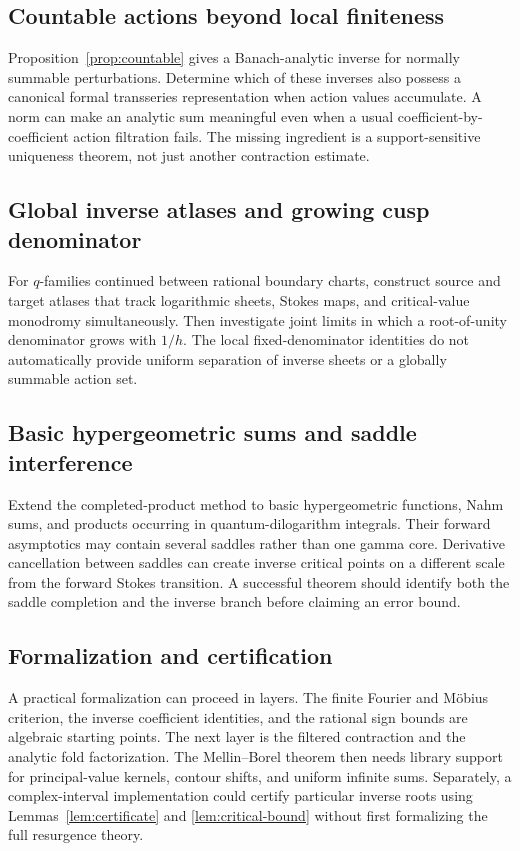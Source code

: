 \documentclass[11pt,a4paper]{article}
\numberwithin{equation}{section}
\theoremstyle{definition}
\theoremstyle{remark}\newtheorem{remark}[theorem]{Remark}
\begin{document}
\subsection{Countable actions beyond local finiteness}
Proposition~\ref{prop:countable} gives a Banach-analytic inverse for
normally summable perturbations. Determine which of these inverses also
possess a canonical formal transseries representation when action
values accumulate. A norm can make an analytic sum meaningful even
when a usual coefficient-by-coefficient action filtration fails.
The missing ingredient is a support-sensitive uniqueness theorem,
not just another contraction estimate.

\subsection{Global inverse atlases and growing cusp denominator}
For $q$-families continued between rational boundary charts, construct
source and target atlases that track logarithmic sheets, Stokes maps,
and critical-value monodromy simultaneously. Then investigate joint
limits in which a root-of-unity denominator grows with $1/h$.
The local fixed-denominator identities do not automatically provide
uniform separation of inverse sheets or a globally summable action set.

\subsection{Basic hypergeometric sums and saddle interference}
Extend the completed-product method to basic hypergeometric functions,
Nahm sums, and products occurring in quantum-dilogarithm integrals.
Their forward asymptotics may contain several saddles rather than one
gamma core. Derivative cancellation between saddles can create inverse
critical points on a different scale from the forward Stokes transition.
A successful theorem should identify both the saddle completion and the
inverse branch before claiming an error bound.

\subsection{Formalization and certification}
A practical formalization can proceed in layers. The finite Fourier and
M\"obius criterion, the inverse coefficient identities, and the
rational sign bounds are algebraic starting points. The next layer is
the filtered contraction and the analytic fold factorization. The
Mellin--Borel theorem then needs library support for principal-value
kernels, contour shifts, and uniform infinite sums. Separately, a
complex-interval implementation could certify particular inverse roots
using Lemmas~\ref{lem:certificate} and \ref{lem:critical-bound} without
first formalizing the full resurgence theory.
\end{document}
